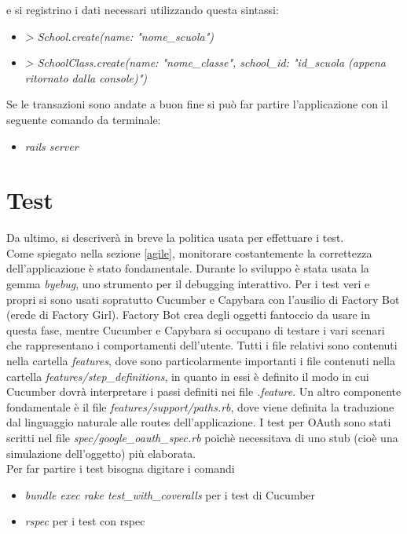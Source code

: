 \documentclass[Lau, binding=0.6cm, oneside]{sapthesis}
\begin{document}
e si registrino i dati necessari utilizzando questa sintassi:
\begin{itemize}
	\item \textit{> School.create(name: "nome\_scuola")}
	\item \textit{> SchoolClass.create(name: "nome\_classe", school\_id: "id\_scuola (appena ritornato dalla console)")}
\end{itemize}

Se le transazioni sono andate a buon fine si può far partire l'applicazione con il seguente comando da terminale: 
\begin{itemize}
	\item \textit{rails server}
\end{itemize}

\section{Test} \label{test}

Da ultimo, si descriverà in breve la politica usata per effettuare i test.\\ 
Come spiegato nella sezione \ref{agile}, monitorare costantemente la correttezza dell'applicazione è stato fondamentale. Durante lo sviluppo è stata usata la gemma \textit{byebug}, uno strumento per il debugging interattivo. Per i test veri e propri si sono usati sopratutto Cucumber e Capybara con l'ausilio di Factory Bot (erede di Factory Girl). Factory Bot crea degli oggetti fantoccio da usare in questa fase, mentre Cucumber e Capybara si occupano di testare i vari scenari che rappresentano i comportamenti dell'utente. Tutti i file relativi sono contenuti nella cartella \textit{features}, dove sono particolarmente importanti i file contenuti nella cartella \textit{features/step\_definitions}, in quanto in essi è definito il modo in cui Cucumber dovrà interpretare i passi definiti nei file \textit{.feature}. Un altro componente fondamentale è il file \textit{features/support/paths.rb}, dove viene definita la traduzione dal linguaggio naturale alle routes dell'applicazione. I test per OAuth sono stati scritti nel file \textit{spec/google\_oauth\_spec.rb} poichè necessitava di uno stub (cioè una simulazione dell'oggetto) più elaborata.\\
Per far partire i test bisogna digitare i comandi 
\begin{itemize}
	\item \textit{bundle exec rake test\_with\_coveralls} per i test di Cucumber
	\item \textit{rspec} per i test con rspec
\end{itemize}
\end{document}
